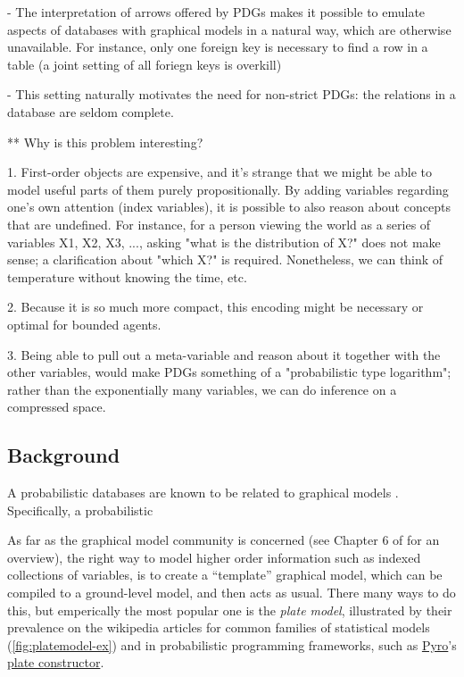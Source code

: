 \documentclass{article}
\theoremstyle{plain}
\theoremstyle{definition}
\theoremstyle{remark}
\begin{document}
- The interpretation of arrows offered by PDGs makes it possible to emulate aspects of databases with graphical models in a natural way, which are otherwise unavailable. For instance, only one foreign key is necessary to find a row in a table (a joint setting of all foriegn keys is overkill)

- This setting naturally motivates the need for non-strict PDGs: the relations in a database are seldom complete.




** Why is this problem interesting?

1. First-order objects are expensive, and it's strange that we might be able to model useful parts of them purely propositionally. By adding variables regarding one's own attention (index variables), it is possible to also reason about concepts that are undefined. For instance, for a person viewing the world as a series of variables X1, X2, X3, ..., asking "what is the distribution of X?" does not make sense; a clarification about "which X?" is required. Nonetheless, we can think of temperature without knowing the time, etc.

2. Because it is so much more compact, this encoding might be necessary or optimal for bounded agents.

3. Being able to pull out a meta-variable and reason about it together with the other variables, would make PDGs something of a "probabilistic type logarithm"; rather than the exponentially many variables, we can do inference on a compressed space.




\subsection{Background}

A probabilistic databases are known to be related to graphical models \cite[\S 1.2.7]{suciu2011probabilistic}. Specifically, a probabilistic 

As far as the graphical model community is concerned (see Chapter 6 of \cite{KF09} for an overview), the right way to model higher order information such as indexed collections of variables, is to create a ``template'' graphical model, which can be compiled to a ground-level model, and then acts as usual. There many ways to do this, but emperically the most popular one is the \emph{plate model}, illustrated by their prevalence on the wikipedia articles for common families of statistical models (\cref{fig:platemodel-ex})
and in probabilistic programming frameworks, such as \href{https://pyro.ai/}{Pyro}'s \href{http://docs.pyro.ai/en/0.3.0-release/primitives.html#pyro.plate}{plate constructor}.
\end{document}
